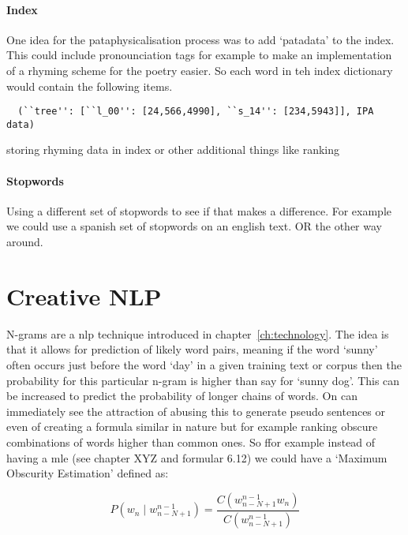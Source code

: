 \paragraph{Index}
One idea for the pataphysicalisation process was to add `patadata' to the index. This could include pronounciation tags for example to make an implementation of a rhyming scheme for the poetry easier. So each word in teh index dictionary would contain the following items.

\begin{verbatim}
  (``tree'': [``l_00'': [24,566,4990], ``s_14'': [234,5943]], IPA data)
\end{verbatim}

storing rhyming data in index or other additional things like ranking

\paragraph{Stopwords}
Using a different set of stopwords to see if that makes a difference. For example we could use a spanish set of stopwords on an english text. OR the other way around.


\section{Creative NLP}
N-grams are a \gls{nlp} technique introduced in chapter~\ref{ch:technology}. The idea is that it allows for prediction of likely word pairs, meaning if the word `sunny' often occurs just before the word `day' in a given training text or corpus then the probability for this particular n-gram is higher than say for `sunny dog'. This can be increased to predict the probability of longer chains of words. On can immediately see the attraction of abusing this to generate pseudo sentences or even of creating a formula similar in nature but for example ranking obscure combinations of words higher than common ones. So ffor example instead of having a \gls{mle} (see chapter XYZ and formular 6.12) we could have a `Maximum Obscurity Estimation' defined as:

\begin{equation}
  P(w_n \mid w_{n-N+1}^{n-1}) = \frac{C(w_{n-N+1}^{n-1} w_n)}{C(w_{n-N+1}^{n-1})}
  \label{eq:probmoe}
\end{equation}

